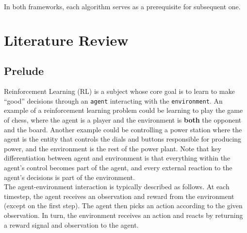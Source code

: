 \documentclass[12pt]{report}
\begin{document}
In both frameworks, each algorithm serves as a prerequisite for subsequent one.


\chapter{Literature Review}
\section{Prelude}

Reinforcement Learning (RL) is a subject whose core goal is to learn to make ``good'' decisions through an \texttt{agent} interacting with the \texttt{environment}. An example of a reinforcement learning problem could be learning to play the game of chess, where the agent is a player and the environment is \textbf{both} the opponent and the board. Another example could be controlling a power station where the agent is the entity that controls the dials and buttons responsible for producing power, and the environment is the rest of the power plant. Note that key differentiation between agent and environment is that everything within the agent's control becomes part of the agent, and every external reaction to the agent's decisions is part of the environment.\\


The agent-environment interaction is typically described as follows. At each timestep, the agent receives an observation and reward from the environment (except on the first step). The agent then picks an action according to the given observation. In turn, the environment receives an action and reacts by returning a reward signal and observation to the agent.\\
\end{document}
